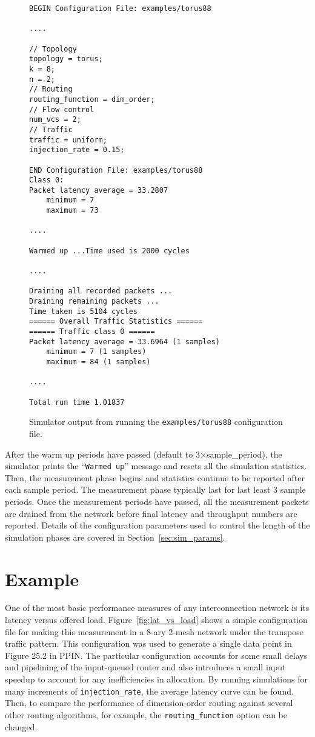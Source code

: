 \documentclass[11pt]{article}
\begin{document}
\begin{figure}
\begin{verbatim}
BEGIN Configuration File: examples/torus88

....

// Topology
topology = torus;
k = 8;
n = 2;
// Routing
routing_function = dim_order;
// Flow control
num_vcs = 2;
// Traffic
traffic = uniform;
injection_rate = 0.15;

END Configuration File: examples/torus88
Class 0:
Packet latency average = 33.2807
	minimum = 7
	maximum = 73

....

Warmed up ...Time used is 2000 cycles

....

Draining all recorded packets ...
Draining remaining packets ...
Time taken is 5104 cycles
====== Overall Traffic Statistics ======
====== Traffic class 0 ======
Packet latency average = 33.6964 (1 samples)
	minimum = 7 (1 samples)
	maximum = 84 (1 samples)

....

Total run time 1.01837
\end{verbatim}
\caption{Simulator output from running the \texttt{examples/torus88}
configuration file.}
\label{fig:sim_output}
\end{figure}

After the warm up periods have passed (default to 3$\times$sample\_period), the simulator prints the
``\texttt{Warmed up}'' message and resets all the simulation statistics.
Then, the measurement phase begins and statistics continue to be
reported after each sample period.  The measurement phase 
typically last for last least 3 sample periods. 
Once the measurement periods have
passed, all the measurement packets are drained from the network
before final latency and throughput numbers are reported.  Details of
the configuration parameters used to control the length of the
simulation phases are covered in Section~\ref{sec:sim_params}.

\section{Example}
\label{sec:examples}

One of the most basic performance measures of any interconnection
network is its latency versus offered load.
Figure~\ref{fig:lat_vs_load} shows a simple configuration file for
making this measurement in a 8-ary 2-mesh network under the transpose
traffic pattern.  This configuration was used to generate a single data point in Figure 25.2
in PPIN.  The particular configuration accounts for some small delays
and pipelining of the input-queued router and also introduces a small
input speedup to account for any inefficiencies in allocation.  By
running simulations for many increments of \texttt{injection\_rate},
the average latency curve can be found.  Then, to compare the
performance of dimension-order routing against several other routing
algorithms, for example, the \texttt{routing\_function} option can be
changed.
\end{document}

